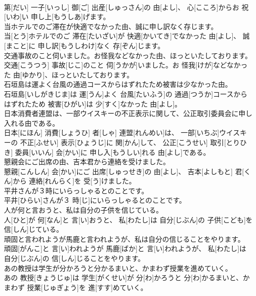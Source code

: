 \documentclass[8pt]{extreport}
\begin{document}
\begin{CJK}{UTF8}{min}
\\	第[だい] 一子[いっし] 御[ご] 出産[しゅっさん]の 由[よし]、 心[こころ]からお 祝[いわ]い 申し上[もうしあ]げます。
\\	当ホテルでのご滞在が快適でなかった由、誠に申し訳なく存じます。	
\\	当[とう]ホテルでのご 滞在[たいざい]が 快適[かいてき]でなかった 由[よし]、 誠[まこと]に 申し訳[もうしわけ]なく 存[ぞん]じます。
\\	交通事故のこと伺いました。お怪我などなかった由、ほっといたしております。	
\\	交通[こうつう] 事故[じこ]のこと 伺[うかが]いました。お 怪我[けが]などなかった 由[ゆかり]、ほっといたしております。
\\	石垣島は運よく台風の通過コースからはずれたため被害は少なかった由。	
\\	石垣島[いしがきじま]は 運[うん]よく 台風[たいふう]の 通過[つうか]コースからはずれたため 被害[ひがい]は 少[すく]なかった 由[よし]。
\\	日本消費者連盟は、一部ウイスキーの不正表示に関して、公正取引委員会に申し入れる由である。	
\\	日本[にほん] 消費[しょうひ] 者[しゃ] 連盟[れんめい]は、 一部[いちぶ]ウイスキーの 不正[ふせい] 表示[ひょうじ]に 関[かん]して、 公正[こうせい] 取引[とりひき] 委員[いいん] 会[かい]に 申し入[もうしい]れる 由[よし]である。
\\	懇親会にご出席の由、吉本君から連絡を受けました。	
\\	懇親[こんしん] 会[かい]にご 出席[しゅっせき]の 由[よし]、 吉本[よしもと] 君[くん]から 連絡[れんらく]を 受[う]けました。
\\	平井さんが３時にいらっしゃるとのことです。	
\\	平井[ひらい]さんが３ 時[じ]にいらっしゃるとのことです。
\\	人が何と言おうと、私は自分の子供を信じている。	
\\	人[ひと]が 何[なん]と 言[い]おうと、 私[わたし]は 自分[じぶん]の 子供[こども]を 信[しん]じている。
\\	頑固と言われようが馬鹿と言われようが、私は自分の信じることをやります。	
\\	頑固[がんこ]と 言[い]われようが 馬鹿[ばか]と 言[い]われようが、 私[わたし]は 自分[じぶん]の 信[しん]じることをやります。
\\	あの教授は学生が分かろうと分かるまいと、かまわず授業を進めていく。	
\\	あの 教授[きょうじゅ]は 学生[がくせい]が 分[わ]かろうと 分[わ]かるまいと、かまわず 授業[じゅぎょう]を 進[すす]めていく。

\end{CJK}
\end{document}

